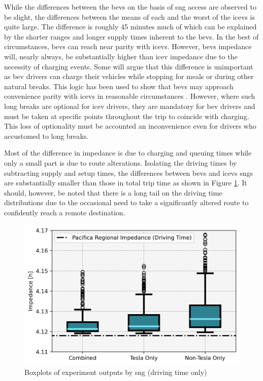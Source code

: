 \documentclass[11pt]{article}
\begin{document}
\begin{multicols}{2}
While the differences between the \glspl{bev} on the basis of \gls{sng} access are observed to be slight, the differences between the means of each and the worst of the \glspl{icev} is quite large. The difference is roughly 45 minutes much of which can be explained by the shorter ranges and longer supply times inherent to the \glspl{bev}. In the best of circumstances, \glspl{bev} can reach near parity with \glspl{icev}. However, \glspl{bev} impedance will, nearly always, be substantially higher than \gls{icev} impedance due to the necessity of charging events. Some will argue that this difference is unimportant as \gls{bev} drivers can charge their vehicles while stopping for meals or during other natural breaks. This logic has been used to show that \glspl{bev} may approach convenience parity with \glspl{icev} in reasonable circumstances \cite{Dixon_2020}. However, where such long breaks are optional for \gls{icev} drivers, they are mandatory for \gls{bev} drivers and must be taken at specific points throughout the trip to coincide with charging. This loss of optionality must be accounted an inconvenience even for drivers who accustomed to long breaks.

Most of the difference in impedance is due to charging and queuing times while only a small part is due to route alterations. Isolating the driving times by subtracting supply and setup times, the differences between \glspl{bev} and \glspl{icev} \glspl{sng} are substantially smaller than those in total trip time as shown in Figure \ref{fig:networks_boxplots_driving}. It should, however, be noted that there is a long tail on the driving time distributions due to the occasional need to take a significantly altered route to confidently reach a remote destination.

\begin{figure}[H]
	\centering
	\includegraphics[width = \linewidth]{figs/Networks_Boxplots_Weighted_Impedance_Driving.png}
	\caption{Boxplots of experiment outputs by \gls{sng} (driving time only)}
	\label{fig:networks_boxplots_driving}
\end{figure}


\end{multicols}
\end{document}
